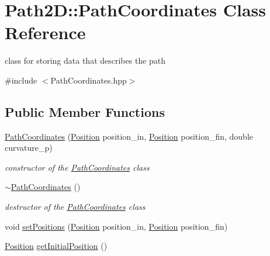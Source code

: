 \hypertarget{class_path2_d_1_1_path_coordinates}{}\section{Path2D\+:\+:Path\+Coordinates Class Reference}
\label{class_path2_d_1_1_path_coordinates}


class for storing data that describes the path  




{\ttfamily \#include $<$Path\+Coordinates.\+hpp$>$}

\subsection*{Public Member Functions}
\begin{DoxyCompactItemize}
\item 
\mbox{\hyperlink{class_path2_d_1_1_path_coordinates_af7be6e64bbe0e3d555a05fb03fc674ef}{Path\+Coordinates}} (\mbox{\hyperlink{class_path2_d_1_1_element_1_1_position}{Position}} position\+\_\+in, \mbox{\hyperlink{class_path2_d_1_1_element_1_1_position}{Position}} position\+\_\+fin, double curvature\+\_\+p)
\begin{DoxyCompactList}\small\item\em constructor of the \mbox{\hyperlink{class_path2_d_1_1_path_coordinates}{Path\+Coordinates}} class \end{DoxyCompactList}\item 
\mbox{\label{class_path2_d_1_1_path_coordinates_a56c02f6dd0fd47748c887fe1cd7cff51}} 
\mbox{\hyperlink{class_path2_d_1_1_path_coordinates_a56c02f6dd0fd47748c887fe1cd7cff51}{$\sim$\+Path\+Coordinates}} ()
\begin{DoxyCompactList}\small\item\em destructor of the \mbox{\hyperlink{class_path2_d_1_1_path_coordinates}{Path\+Coordinates}} class \end{DoxyCompactList}\item 
void \mbox{\hyperlink{class_path2_d_1_1_path_coordinates_a0a38aea42684b3297b9820473f51ec75}{set\+Positions}} (\mbox{\hyperlink{class_path2_d_1_1_element_1_1_position}{Position}} position\+\_\+in, \mbox{\hyperlink{class_path2_d_1_1_element_1_1_position}{Position}} position\+\_\+fin)
\item 
\mbox{\hyperlink{class_path2_d_1_1_element_1_1_position}{Position}} \mbox{\hyperlink{class_path2_d_1_1_path_coordinates_ac190a5bf882f2eaff2c52838cb1736df}{get\+Initial\+Position}} ()

\end{DoxyCompactItemize}
